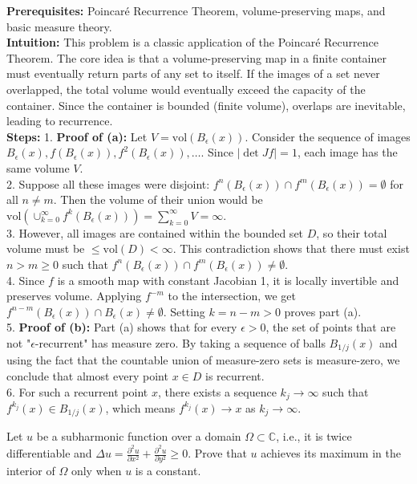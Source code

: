 \begin{solution}
\textbf{Prerequisites:} Poincaré Recurrence Theorem, volume-preserving maps, and basic measure theory. \\[1em]
\textbf{Intuition:} This problem is a classic application of the Poincaré Recurrence Theorem. The core idea is that a volume-preserving map in a finite container must eventually return parts of any set to itself. If the images of a set never overlapped, the total volume would eventually exceed the capacity of the container. Since the container is bounded (finite volume), overlaps are inevitable, leading to recurrence. \\[1em]
\textbf{Steps:}
1. \textbf{Proof of (a):} Let $V = \text{vol}(B_\epsilon(x))$. Consider the sequence of images $B_\epsilon(x), f(B_\epsilon(x)), f^2(B_\epsilon(x)), \dots$. Since $|\det Jf| = 1$, each image has the same volume $V$. \\[1em]
2. Suppose all these images were disjoint: $f^n(B_\epsilon(x)) \cap f^m(B_\epsilon(x)) = \emptyset$ for all $n \neq m$. Then the volume of their union would be $\text{vol}(\cup_{k=0}^\infty f^k(B_\epsilon(x))) = \sum_{k=0}^\infty V = \infty$. \\[1em]
3. However, all images are contained within the bounded set $D$, so their total volume must be $\leq \text{vol}(D) < \infty$. This contradiction shows that there must exist $n > m \geq 0$ such that $f^n(B_\epsilon(x)) \cap f^m(B_\epsilon(x)) \neq \emptyset$. \\[1em]
4. Since $f$ is a smooth map with constant Jacobian 1, it is locally invertible and preserves volume. Applying $f^{-m}$ to the intersection, we get $f^{n-m}(B_\epsilon(x)) \cap B_\epsilon(x) \neq \emptyset$. Setting $k = n-m > 0$ proves part (a). \\[1em]
5. \textbf{Proof of (b):} Part (a) shows that for every $\epsilon > 0$, the set of points that are not "$\epsilon$-recurrent" has measure zero. By taking a sequence of balls $B_{1/j}(x)$ and using the fact that the countable union of measure-zero sets is measure-zero, we conclude that almost every point $x \in D$ is recurrent. \\[1em]
6. For such a recurrent point $x$, there exists a sequence $k_j \to \infty$ such that $f^{k_j}(x) \in B_{1/j}(x)$, which means $f^{k_j}(x) \to x$ as $k_j \to \infty$.
\end{solution}

\begin{exercise}
\label{analysis:2014:11}
Let $u$ be a subharmonic function over a domain $\Omega\subset\mathbb{C}$, i.e., it is twice differentiable and $\Delta u = \frac{\partial^2 u}{\partial x^2} + \frac{\partial^2 u}{\partial y^2} \geq 0$. Prove that $u$ achieves its maximum in the interior of $\Omega$ only when $u$ is a constant.
\end{exercise}

